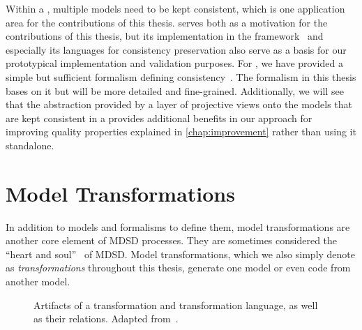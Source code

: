 Within a \vsum, multiple models need to be kept consistent, which is one application area for the contributions of this thesis.
\vitruv serves both as a motivation for the contributions of this thesis, but its implementation in the \vitruv framework~ and especially its languages for consistency preservation also serve as a basis for our prototypical implementation and validation purposes.
For \vitruv, we have provided a simple but sufficient formalism defining consistency~.
The formalism in this thesis bases on it but will be more detailed and fine-grained.
Additionally, we will see that the abstraction provided by a layer of projective views onto the models that are kept consistent in a \vsum provides additional benefits in our approach for improving quality properties explained in \autoref{chap:improvement} rather than using it standalone.


\section{Model Transformations}
\label{chap:foundations:transformations}

In addition to models and formalisms to define them, model transformations are another core element of \gls{MDSD} processes.
They are sometimes considered the \enquote{heart and soul}~\cite{sendall2003modelTransformation-Software} of \gls{MDSD}.
Model transformations, which we also simply denote as \emph{transformations} throughout this thesis, generate one model or even code from another model.

\begin{figure}
    \centering
    
    \caption[Transformation artifacts and their relations]{Artifacts of a transformation and transformation language, as well as their relations. Adapted from~\cite[Fig.~9-5]{kleppe2003mdaExplained-Book}.}
    \label{fig:foundations:transformation}
\end{figure}

